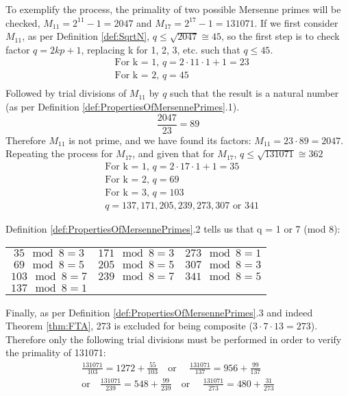 To exemplify the process, the primality of two possible Mersenne primes will be checked, $M_{11} = 2^{11}-1 = 2047$  and $M_{17} = 2^{17} - 1 = 131071$. If we first consider $M_{11}$, as per Definition \ref{def:SqrtN}, $q \le \sqrt{2047} \cong 45$, so the first step is to check factor $q = 2kp+1$, replacing k for 1, 2, 3, etc. such that $q \le 45$.
\begin{equation*}
\begin{split}
&\text{For k = 1, } q = 2 \cdot 11 \cdot 1 + 1 = 23 \\
&\text{For k = 2, } q = 45 \\
\end{split}
\end{equation*}
Followed by trial divisions of $M_{11}$ by $q$ such that the result is a natural number (as per Definition \ref{def:PropertiesOfMersennePrimes}.1).
\begin{equation*}
	\frac{2047}{23} = 89
\end{equation*}
Therefore $M_{11}$ is not prime, and we have found its factors: $M_{11} = 23 \cdot 89 = 2047$.
Repeating the process for $M_{17}$, and given that for $M_{17}$, $q \le \sqrt{131071} \cong 362$
\begin{equation*}
\begin{split}
&\text{For k = 1, } q = 2 \cdot 17 \cdot 1 + 1 = 35 \\
&\text{For k = 2, } q = 69 \\
&\text{For k = 3, } q = 103 \\
&q = 137, 171, 205, 239, 273, 307\text{ or }341
\end{split}
\end{equation*}

\vspace{2cm} %
Definition \ref{def:PropertiesOfMersennePrimes}.2 tells us that q = 1 or 7 (mod 8):
\begin{table} [h]
	\centering
\begin{tabular} {c c c}
\sout{$35 \mod 8 = 3$}		& \sout{$171 \mod 8 = 3$}	& $273 \mod 8 = 1 $ \\
\sout{$69 \mod 8 = 5$}		& \sout{$205 \mod 8 = 5$}	& \sout{$ 307 \mod 8 = 3 $}\\
$103 \mod 8 = 7$	& $239 \mod 8 = 7$	& \sout{$ 341 \mod 8 = 5 $}\\
$137 \mod 8 = 1$ 
\end{tabular}
\end{table}

Finally, as per Definition \ref{def:PropertiesOfMersennePrimes}.3 and indeed Theorem \ref{thm:FTA}, 273 is excluded for being composite ($3\cdot7\cdot13 = 273$). Therefore only the following trial divisions must be performed in order to verify the primality of 131071:
\begin{equation*}
\begin{split}
	\frac{131071}{103} = 1272 + \frac{55}{103}  \quad\text{or }\quad \frac{131071}{137} = 956 + \frac{99}{137} \\[2ex]
	\text{or} \quad \frac{131071}{239} = 548 + \frac{99}{239} \quad\text{or }\quad \frac{131071}{273} = 480 + \frac{31}{273} \\[2ex]
\end{split}
\end{equation*}


